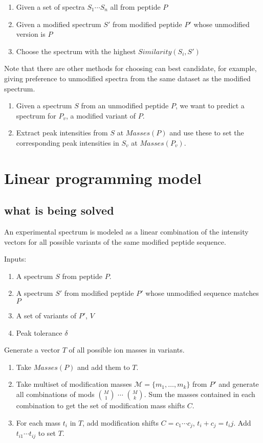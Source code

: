 \documentclass[11pt]{article}
\begin{document}
\begin{enumerate}
\item Given a set of spectra $S_1 \cdots S_n$ all from peptide $P$
\item Given a modified spectrum $S'$ from modified peptide $P'$ whose unmodified version is $P$
\item Choose the spectrum with the highest $Similarity(S_i, S')$
\end{enumerate}

Note that there are other methods for choosing can best candidate, for example, giving preference to unmodified spectra from the same dataset as the modified spectrum.

\begin{enumerate}
\item Given a spectrum $S$ from an unmodified peptide $P$, we want to predict a spectrum for $P_v$, a modified variant of $P$.
\item Extract peak intensities from $S$ at $Masses(P)$ and use these to set the corresponding peak intensities in $S_v$ at $Masses(P_v)$.
\end{enumerate}


\section{Linear programming model}

\subsection{what is being solved}
An experimental spectrum is modeled as a linear combination of the intensity vectors for all possible variants of the same modified peptide sequence.

Inputs:
\begin{enumerate}
\item A spectrum $S$ from peptide $P$.
\item A spectrum $S'$ from modified peptide $P'$ whose unmodified sequence matches $P$
\item A set of variants of $P'$, $V$
\item Peak tolerance $\delta$
\end{enumerate}

Generate a vector $T$ of all possible ion masses in variants.
\begin{enumerate}
\item Take $Masses(P)$ and add them to $T$.
\item Take multiset of modification masses $\mathcal{M}=\{m_1,\ldots,m_k\}$ from $P'$ and generate all combinations of mods $M \choose 1$ $\cdots$ $M \choose k$. Sum the masses contained in each combination to get the set of modification mass shifts $C$. 
\item For each mass $t_i$ in $T$, add modification shifts $C=c_1 \cdots c_j$, $t_i+c_j = t_ij$. Add $t_{i1} \cdots t_{ij}$ to set $T$.
\end{enumerate}
\end{document}
